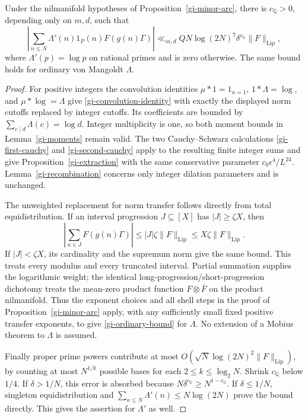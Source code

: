 \begin{corollary}\label{gi-ordinary-primes}
Under the nilmanifold hypotheses of Proposition~\ref{gi-minor-arc},
there is $c_{\mathbb Q}>0$, depending only on $m,d$, such that
\begin{equation}\label{gi-ordinary-bound}
 \left|\sum_{n\leq N}\Lambda'(n)1_P(n)F(g(n)\Gamma)\right|
 \ll_{m,d} QN\log(2N)^7\delta^{c_{\mathbb Q}}\|F\|_{\mathrm{Lip}},
\end{equation}
where $\Lambda'(p)=\log p$ on rational primes and is zero otherwise.
The same bound holds for ordinary von Mangoldt $\Lambda$.
\end{corollary}
\begin{proof}
For positive integers the convolution identities
$\mu*1=1_{n=1}$, $1*\Lambda=\log$, and $\mu*\log=\Lambda$ give
\eqref{gi-convolution-identity} with exactly the displayed norm cutoffs
replaced by integer cutoffs.  Its coefficients are bounded by
$\sum_{c\mid d}\Lambda(c)=\log d$.  Integer multiplicity is one,
so both moment bounds in Lemma~\ref{gi-moments} remain valid.  The
two Cauchy--Schwarz calculations \eqref{gi-first-cauchy} and
\eqref{gi-second-cauchy} apply to the resulting finite integer sums
and give Proposition~\ref{gi-extraction} with the same conservative
parameter $c_0\epsilon^4/L^{24}$.  Lemma~\ref{gi-recombination} concerns
only integer dilation parameters and is unchanged.

The unweighted replacement for norm transfer follows directly from
total equidistribution.  If an interval progression $J\subseteq[X]$
has $|J|\geq\zeta X$, then
\[
 \left|\sum_{n\in J}F(g(n)\Gamma)\right|
       \leq |J|\zeta\|F\|_{\mathrm{Lip}}
       \leq X\zeta\|F\|_{\mathrm{Lip}}.
\]
If $|J|<\zeta X$, its cardinality and the supremum norm give the same
bound.  This treats every modulus and every truncated interval.
Partial summation supplies the logarithmic weight; the identical
long-progression/short-progression dichotomy treats the mean-zero
product function $F\otimes\overline F$ on the product nilmanifold.
Thus the exponent choices and all shell steps in the proof of
Proposition~\ref{gi-minor-arc} apply, with any sufficiently small
fixed positive transfer exponents, to give \eqref{gi-ordinary-bound}
for $\Lambda$.  No extension of a Mobius theorem to $\Lambda$ is assumed.

Finally proper prime powers contribute at most
$O(\sqrt N\log(2N)^2\|F\|_{\mathrm{Lip}})$, by counting at most
$N^{1/k}$ possible bases for each $2\leq k\leq\log_2N$.
Shrink $c_{\mathbb Q}$ below $1/4$.  If $\delta>1/N$, this error is
absorbed because $N\delta^{c_{\mathbb Q}}\geq N^{1-c_{\mathbb Q}}$.
If $\delta\leq1/N$, singleton equidistribution and
$\sum_{n\leq N}\Lambda'(n)\leq N\log(2N)$ prove the bound directly.
This gives the assertion for $\Lambda'$ as well.
\end{proof}



